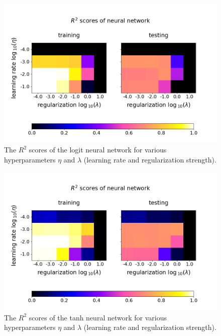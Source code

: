 \documentclass[nofootinbib,reprint,english]{revtex4-1}
\begin{document}
\begin{figure}[ht]
\centering
\includegraphics[scale=0.38]{../output/NNReg/R2Scores_logit_1.png}
\caption{The \(R^2\) scores of the logit neural network for various hyperparameters \(\eta\) and \(\lambda\) (learning rate and regularization strength).}\label{fig:NNReg_HyperAnalysis_Logit1}
\end{figure}

\begin{figure}[ht]
\centering
\includegraphics[scale=0.38]{../output/NNReg/R2Scores_tanh_1.png}
\caption{The \(R^2\) scores of the tanh neural network for various hyperparameters \(\eta\) and \(\lambda\) (learning rate and regularization strength).}\label{fig:NNReg_HyperAnalysis_Tanh1}
\end{figure}
\end{document}
